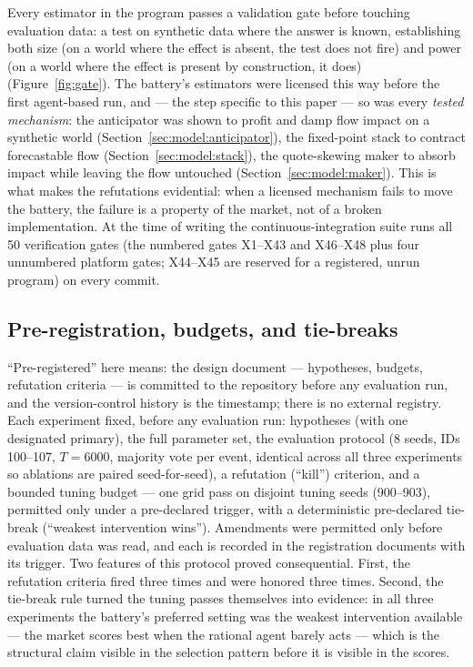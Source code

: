 \documentclass[11pt]{article}
\begin{document}
Every estimator in the program passes a validation gate before touching
evaluation data:
a test on synthetic data where the answer is known, establishing both size (on
a world where the effect is absent, the test does not fire) and power (on a
world where the effect is present by construction, it does)
(Figure~\ref{fig:gate}). The battery's estimators were licensed this way
before the first agent-based run, and --- the step specific to this paper ---
so was every \emph{tested mechanism}: the anticipator was shown to profit and
damp flow impact on a synthetic world (Section~\ref{sec:model:anticipator}),
the fixed-point
stack to contract forecastable flow (Section~\ref{sec:model:stack}), the
quote-skewing maker to absorb impact while leaving the flow untouched
(Section~\ref{sec:model:maker}). This is what makes the refutations
evidential:
when a licensed mechanism fails to move the battery, the failure is a property
of the market, not of a broken implementation. At the time of writing the
continuous-integration suite runs all 50 verification gates (the numbered gates X1--X43 and X46--X48 plus four unnumbered platform gates; X44--X45 are reserved for a registered, unrun program) on every commit. %

\subsection{Pre-registration, budgets, and tie-breaks}
\label{sec:prereg}

``Pre-registered'' here means: the design document --- hypotheses, budgets,
refutation criteria --- is committed to the repository before any evaluation
run, and the version-control history is the timestamp; there is no external
registry. Each experiment fixed, before any evaluation run: hypotheses (with
one designated primary), the full parameter set, the evaluation protocol (8
seeds, IDs 100--107, $T = 6000$, majority vote per event, identical across
all three experiments so ablations are paired seed-for-seed), a refutation
(``kill'')
criterion, and a bounded tuning budget --- one grid pass on disjoint tuning seeds (900--903), permitted
only under a pre-declared trigger, with a deterministic pre-declared tie-break
(``weakest intervention wins''). Amendments were permitted only before
evaluation data was read, and each is recorded in the registration documents
with its trigger. Two features of this protocol proved consequential. First, the
refutation criteria fired three times and were honored three times. Second,
the
tie-break rule turned the tuning passes themselves into evidence: in all three
experiments the battery's preferred setting was the weakest intervention
available --- the market scores best when the rational agent barely acts ---
which is the structural claim visible in the selection pattern before it is
visible in the scores.
\end{document}
